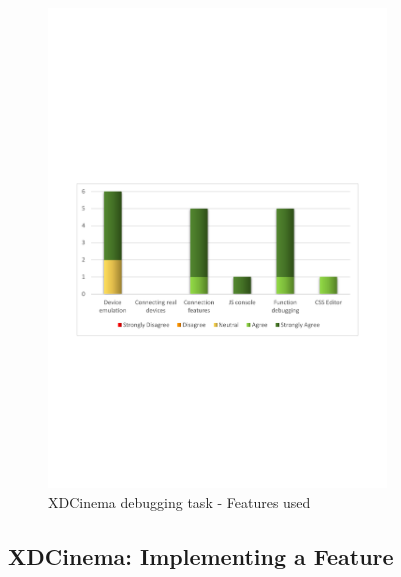 \begin{figure}[H]
  \centering
    \includegraphics[width=0.8\textwidth]{images/charts/xdc_bug_features_used.pdf}
	\caption[xdc-bug: Features used]{XDCinema debugging task - Features used}
	\label{fig:xdc_bug_features_used}
\end{figure}

\subsection{XDCinema: Implementing a Feature}


